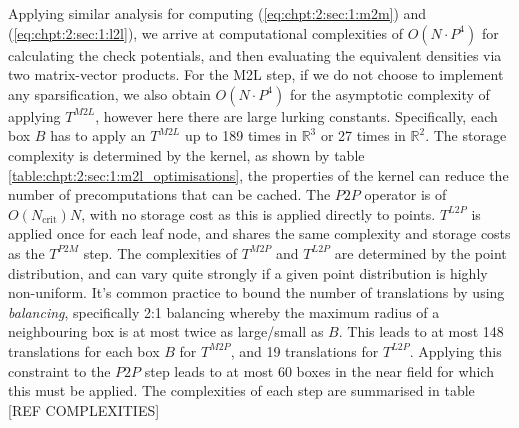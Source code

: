 Applying similar analysis for computing (\ref{eq:chpt:2:sec:1:m2m}) and (\ref{eq:chpt:2:sec:1:l2l}), we arrive at computational complexities of $O(N \cdot P^4)$ for calculating the check potentials, and then evaluating the equivalent densities via two matrix-vector products. For the M2L step, if we do not choose to implement any sparsification, we also obtain $O(N \cdot P^4)$ for the asymptotic complexity of applying $T^{M2L}$, however here there are large lurking constants. Specifically, each box $B$ has to apply an $T^{M2L}$ up to 189 times in $\mathbb{R}^3$ or 27 times in $\mathbb{R}^2$. The storage complexity is determined by the kernel, as shown by table \ref{table:chpt:2:sec:1:m2l_optimisations}, the properties of the kernel can reduce the number of precomputations that can be cached. The $P2P$ operator is of $O(N_{\text{crit}}) N$, with no storage cost as this is applied directly to points. $T^{L2P}$ is applied once for each leaf node, and shares the same complexity and storage costs as the $T^{P2M}$ step. The complexities of $T^{M2P}$ and $T^{L2P}$ are determined by the point distribution, and can vary quite strongly if a given point distribution is highly non-uniform. It's common practice to bound the number of translations by using \textit{balancing}, specifically 2:1 balancing whereby the maximum radius of a neighbouring box is at most twice as large/small as $B$. This leads to at most 148 translations for each box $B$ for $T^{M2P}$, and 19 translations for $T^{L2P}$. Applying this constraint to the $P2P$ step leads to at most 60 boxes in the near field for which this must be applied. The complexities of each step are summarised in table [REF COMPLEXITIES]

